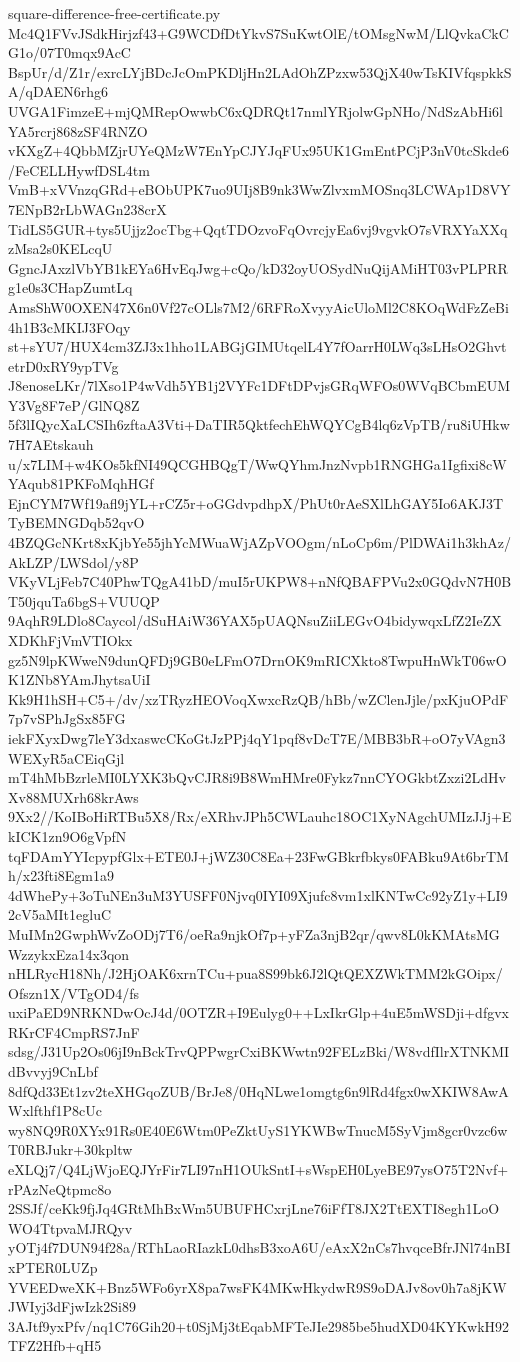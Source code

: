 \documentclass[11pt]{article}
\theoremstyle{definition}
\theoremstyle{remark}
\begin{document}
\begin{filecontents*}[overwrite]{square-difference-free-certificate.py}
Mc4Q1FVvJSdkHirjzf43+G9WCDfDtYkvS7SuKwtOlE/tOMsgNwM/LlQvkaCkCG1o/07T0mqx9AcC
BspUr/d/Z1r/exrcLYjBDcJcOmPKDljHn2LAdOhZPzxw53QjX40wTsKIVfqspkkSA/qDAEN6rhg6
UVGA1FimzeE+mjQMRepOwwbC6xQDRQt17nmlYRjolwGpNHo/NdSzAbHi6lYA5rcrj868zSF4RNZO
vKXgZ+4QbbMZjrUYeQMzW7EnYpCJYJqFUx95UK1GmEntPCjP3nV0tcSkde6/FeCELLHywfDSL4tm
VmB+xVVnzqGRd+eBObUPK7uo9UIj8B9nk3WwZlvxmMOSnq3LCWAp1D8VY7ENpB2rLbWAGn238crX
TidLS5GUR+tys5Ujjz2ocTbg+QqtTDOzvoFqOvrcjyEa6vj9vgvkO7sVRXYaXXqzMsa2s0KELcqU
GgncJAxzlVbYB1kEYa6HvEqJwg+cQo/kD32oyUOSydNuQijAMiHT03vPLPRRg1e0s3CHapZumtLq
AmsShW0OXEN47X6n0Vf27cOLls7M2/6RFRoXvyyAicUloMl2C8KOqWdFzZeBi4h1B3cMKIJ3FOqy
st+sYU7/HUX4cm3ZJ3x1hho1LABGjGIMUtqelL4Y7fOarrH0LWq3sLHsO2GhvtetrD0xRY9ypTVg
J8enoseLKr/7lXso1P4wVdh5YB1j2VYFc1DFtDPvjsGRqWFOs0WVqBCbmEUMY3Vg8F7eP/GlNQ8Z
5f3lIQycXaLCSIh6zftaA3Vti+DaTIR5QktfechEhWQYCgB4lq6zVpTB/ru8iUHkw7H7AEtskauh
u/x7LIM+w4KOs5kfNI49QCGHBQgT/WwQYhmJnzNvpb1RNGHGa1Igfixi8cWYAqub81PKFoMqhHGf
EjnCYM7Wf19afl9jYL+rCZ5r+oGGdvpdhpX/PhUt0rAeSXlLhGAY5Io6AKJ3TTyBEMNGDqb52qvO
4BZQGcNKrt8xKjbYe55jhYcMWuaWjAZpVOOgm/nLoCp6m/PlDWAi1h3khAz/AkLZP/LWSdol/y8P
VKyVLjFeb7C40PhwTQgA41bD/muI5rUKPW8+nNfQBAFPVu2x0GQdvN7H0BT50jquTa6bgS+VUUQP
9AqhR9LDlo8Caycol/dSuHAiW36YAX5pUAQNsuZiiLEGvO4bidywqxLfZ2IeZXXDKhFjVmVTIOkx
gz5N9lpKWweN9dunQFDj9GB0eLFmO7DrnOK9mRICXkto8TwpuHnWkT06wOK1ZNb8YAmJhytsaUiI
Kk9H1hSH+C5+/dv/xzTRyzHEOVoqXwxcRzQB/hBb/wZClenJjle/pxKjuOPdF7p7vSPhJgSx85FG
iekFXyxDwg7leY3dxaswcCKoGtJzPPj4qY1pqf8vDcT7E/MBB3bR+oO7yVAgn3WEXyR5aCEiqGjl
mT4hMbBzrleMI0LYXK3bQvCJR8i9B8WmHMre0Fykz7nnCYOGkbtZxzi2LdHvXv88MUXrh68krAws
9Xx2//KoIBoHiRTBu5X8/Rx/eXRhvJPh5CWLauhc18OC1XyNAgchUMIzJJj+EkICK1zn9O6gVpfN
tqFDAmYYIcpypfGlx+ETE0J+jWZ30C8Ea+23FwGBkrfbkys0FABku9At6brTMh/x23fti8Egm1a9
4dWhePy+3oTuNEn3uM3YUSFF0Njvq0IYI09Xjufc8vm1xlKNTwCc92yZ1y+LI92cV5aMIt1egluC
MuIMn2GwphWvZoODj7T6/oeRa9njkOf7p+yFZa3njB2qr/qwv8L0kKMAtsMGWzzykxEza14x3qon
nHLRycH18Nh/J2HjOAK6xrnTCu+pua8S99bk6J2lQtQEXZWkTMM2kGOipx/Ofszn1X/VTgOD4/fs
uxiPaED9NRKNDwOcJ4d/0OTZR+I9Eulyg0++LxIkrGlp+4uE5mWSDji+dfgvxRKrCF4CmpRS7JnF
sdsg/J31Up2Os06jI9nBckTrvQPPwgrCxiBKWwtn92FELzBki/W8vdfIlrXTNKMIdBvvyj9CnLbf
8dfQd33Et1zv2teXHGqoZUB/BrJe8/0HqNLwe1omgtg6n9lRd4fgx0wXKIW8AwAWxlfthf1P8cUc
wy8NQ9R0XYx91Rs0E40E6Wtm0PeZktUyS1YKWBwTnucM5SyVjm8gcr0vzc6wT0RBJukr+30kpltw
eXLQj7/Q4LjWjoEQJYrFir7LI97nH1OUkSntI+sWspEH0LyeBE97ysO75T2Nvf+rPAzNeQtpmc8o
2SSJf/ceKk9fjJq4GRtMhBxWm5UBUFHCxrjLne76iFfT8JX2TtEXTI8egh1LoOWO4TtpvaMJRQyv
yOTj4f7DUN94f28a/RThLaoRIazkL0dhsB3xoA6U/eAxX2nCs7hvqceBfrJNl74nBIxPTER0LUZp
YVEEDweXK+Bnz5WFo6yrX8pa7wsFK4MKwHkydwR9S9oDAJv8ov0h7a8jKWJWIyj3dFjwIzk2Si89
3AJtf9yxPfv/nq1C76Gih20+t0SjMj3tEqabMFTeJIe2985be5hudXD04KYKwkH92TFZ2Hfb+qH5

\end{filecontents*}
\end{document}
